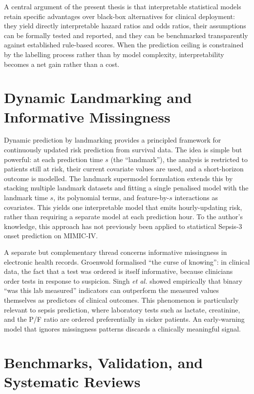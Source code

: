 A central argument of the present thesis is that interpretable statistical
models retain specific advantages over black-box alternatives for clinical
deployment: they yield directly interpretable hazard ratios and odds ratios,
their assumptions can be formally tested and reported, and they can be
benchmarked transparently against established rule-based scores. When the
prediction ceiling is constrained by the labelling process rather than by
model complexity, interpretability becomes a net gain rather than a cost.

\section{Dynamic Landmarking and Informative Missingness}
\label{sec:landmark_miss}

Dynamic prediction by landmarking \cite{vanhouwelingen2007landmark} provides
a principled framework for continuously updated risk prediction from survival
data. The idea is simple but powerful: at each prediction time $s$ (the
``landmark''), the analysis is restricted to patients still at risk, their
current covariate values are used, and a short-horizon outcome is modelled.
The landmark supermodel formulation \cite{fries2023dynamiclm} extends this by
stacking multiple landmark datasets and fitting a single penalised model with
the landmark time $s$, its polynomial terms, and feature-by-$s$ interactions as
covariates. This yields one interpretable model that emits hourly-updating risk,
rather than requiring a separate model at each prediction hour. To the
author's knowledge, this approach has not previously been applied to
statistical Sepsis-3 onset prediction on MIMIC-IV.

A separate but complementary thread concerns informative missingness in
electronic health records. Groenwold \cite{groenwold2020missingness} formalised
``the curse of knowing'': in clinical data, the fact that a test was ordered
is itself informative, because clinicians order tests in response to suspicion.
Singh \emph{et al.} \cite{singh2021missingness} showed empirically that binary
``was this lab measured'' indicators can outperform the measured values
themselves as predictors of clinical outcomes. This phenomenon is particularly
relevant to sepsis prediction, where laboratory tests such as lactate,
creatinine, and the P/F ratio are ordered preferentially in sicker patients.
An early-warning model that ignores missingness patterns discards a
clinically meaningful signal.

\section{Benchmarks, Validation, and Systematic Reviews}
\label{sec:benchmark}

